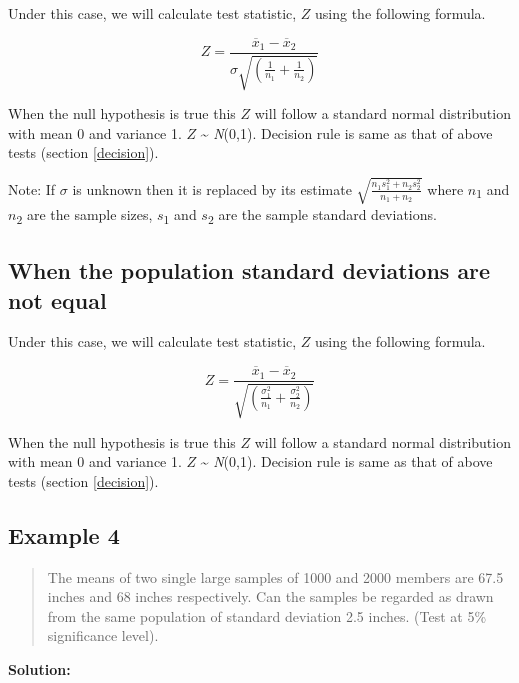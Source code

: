 \documentclass[
]{book}
\begin{document}
Under this case, we will calculate test statistic, \(Z\) using the following formula.

\[Z = \frac{{\overline{x}}_{1} - {\overline{x}}_{2}}{\sigma\sqrt{\left( \frac{1}{n_{1}} + \frac{1}{n_{2}} \right)}}\]

When the null hypothesis is true this \(Z\) will follow a standard normal distribution with mean 0 and variance 1. \(Z\) \textasciitilde{} \emph{N}(0,1). Decision rule is same as that of above tests (section \ref{decision}).

Note: If \(σ\) is unknown then it is replaced by its estimate
\(\sqrt{\frac{n_{1}s_{1}^{2} + n_{2}s_{2}^{2}}{n_{1} + n_{2}}}\) where \(n\)\textsubscript{1} and \(n\)\textsubscript{2} are the sample sizes, \(s\)\textsubscript{1} and \(s\)\textsubscript{2} are the sample standard deviations.

\hypertarget{when-the-population-standard-deviations-are-not-equal}{%
\subsection{When the population standard deviations are not equal}\label{when-the-population-standard-deviations-are-not-equal}}

Under this case, we will calculate test statistic, \(Z\) using the following formula.

\[Z = \frac{{\overline{x}}_{1} - {\overline{x}}_{2}}{\sqrt{\left( \frac{\sigma_{1}^{2}}{n_{1}} + \frac{\sigma_{2}^{2}}{n_{2}} \right)}}\]

When the null hypothesis is true this \(Z\) will follow a standard normal distribution with mean 0 and variance 1. \(Z\) \textasciitilde{} \emph{N}(0,1). Decision rule is same as that of above tests (section \ref{decision}).

\hypertarget{example-4-1}{%
\subsection*{Example 4}\label{example-4-1}}

\begin{quote}
The means of two single large samples of 1000 and 2000 members are 67.5 inches and 68 inches respectively. Can the samples be regarded as drawn from the same population of standard deviation 2.5 inches. (Test at 5\% significance level).
\end{quote}

\textbf{Solution:}
\end{document}

